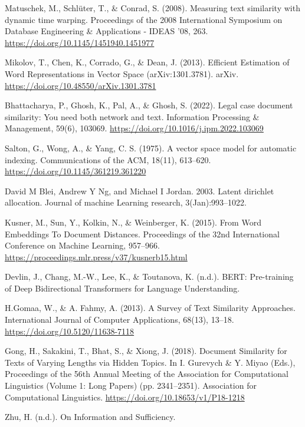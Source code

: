 \documentclass[UTF8]{ctexart}
\begin{document}
\begin{thebibliography}{99}

     Matuschek, M., Schlüter, T., \& Conrad, S. (2008). Measuring text similarity with dynamic time warping. Proceedings of the 2008 International Symposium on Database Engineering \& Applications - IDEAS ’08, 263. \url{https://doi.org/10.1145/1451940.1451977}

     Mikolov, T., Chen, K., Corrado, G., \& Dean, J. (2013). Efficient Estimation of Word Representations in Vector Space (arXiv:1301.3781). arXiv. \url{https://doi.org/10.48550/arXiv.1301.3781}

     Bhattacharya, P., Ghosh, K., Pal, A., \& Ghosh, S. (2022). Legal case document similarity: You need both network and text. Information Processing \& Management, 59(6), 103069. \url{https://doi.org/10.1016/j.ipm.2022.103069}

     Salton, G., Wong, A., \& Yang, C. S. (1975). A vector space model for automatic indexing. Communications of the ACM, 18(11), 613–620. \url{https://doi.org/10.1145/361219.361220}

     David M Blei, Andrew Y Ng, and Michael I Jordan. 2003. Latent dirichlet allocation. Journal of machine Learning research, 3(Jan):993–1022.

     Kusner, M., Sun, Y., Kolkin, N., \& Weinberger, K. (2015). From Word Embeddings To Document Distances. Proceedings of the 32nd International Conference on Machine Learning, 957–966. \url{https://proceedings.mlr.press/v37/kusnerb15.html}

     Devlin, J., Chang, M.-W., Lee, K., \& Toutanova, K. (n.d.). BERT: Pre-training of Deep Bidirectional Transformers for Language Understanding.

     H.Gomaa, W., \& A. Fahmy, A. (2013). A Survey of Text Similarity Approaches. International Journal of Computer Applications, 68(13), 13–18. \url{https://doi.org/10.5120/11638-7118}

     Gong, H., Sakakini, T., Bhat, S., \& Xiong, J. (2018). Document Similarity for Texts of Varying Lengths via Hidden Topics. In I. Gurevych \& Y. Miyao (Eds.), Proceedings of the 56th Annual Meeting of the Association for Computational Linguistics (Volume 1: Long Papers) (pp. 2341–2351). Association for Computational Linguistics. \url{https://doi.org/10.18653/v1/P18-1218}

     Zhu, H. (n.d.). On Information and Sufficiency.


\end{thebibliography}
\end{document}
